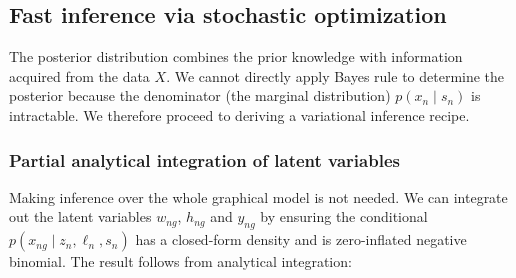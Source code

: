 \subsection{Fast inference via stochastic optimization}
The posterior distribution combines the prior knowledge with information acquired from the data $X$. We cannot directly apply Bayes rule to determine the posterior because the denominator (the marginal distribution) $p(x_n \mid s_n)$ is intractable. We therefore proceed to deriving a variational inference recipe. 

\subsubsection{Partial analytical integration of latent variables}
Making inference over the whole graphical model is not needed. We can integrate out the latent variables $w_{ng}$, $h_{ng}$ and $y_{ng}$ by ensuring the conditional $p(x_{ng} \mid z_{n}, \ell_{n}, s_n)$ has a closed-form density and is zero-inflated negative binomial. The result follows from analytical integration:

